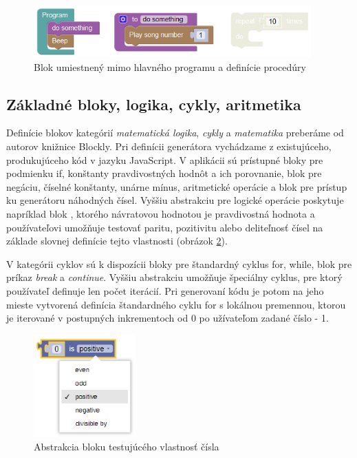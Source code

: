 \begin{figure}
\centerline{\includegraphics[width=0.95\textwidth]{images/disabled-orphan-block}}
\caption[Blok umiestnený mimo hlavného programu a definície procedúry]{Blok umiestnený mimo hlavného programu a definície procedúry}
\label{obr:disabled-orphan-block}
\end{figure}

\subsection{Základné bloky, logika, cykly, aritmetika}
Definície blokov kategórií \textit{matematická logika}, \textit{cykly} a \textit{matematika} preberáme od autorov knižnice Blockly. Pri definícii generátora vychádzame z existujúceho, produkujúceho kód v jazyku JavaScript. V aplikácii sú prístupné bloky pre podmienku if, konštanty pravdivostných hodnôt a ich porovnanie, blok pre negáciu, číselné konštanty, unárne mínus, aritmetické operácie a blok pre prístup ku generátoru náhodných čísel. Vyššiu abstrakciu pre logické operácie poskytuje napríklad blok , ktorého návratovou hodnotou je pravdivostná hodnota a používateľovi umožňuje testovať paritu, pozitivitu alebo deliteľnosť čísel na základe slovnej definície tejto vlastnosti (obrázok \ref{obr:block-number-property}).

V kategórii cyklov sú k dispozícii bloky pre štandardný cyklus for, while, blok pre príkaz \textit{break} a \textit{continue}. Vyššiu abstrakciu umožňuje špeciálny cyklus, pre ktorý používateľ definuje len počet iterácií. Pri generovaní kódu je potom na jeho mieste vytvorená definícia štandardného cyklu for s lokálnou premennou, ktorou je iterované v postupných inkrementoch od 0 po užívateľom zadané číslo - 1.

\begin{figure}
\centerline{\includegraphics[width=0.35\textwidth]{images/block-number-property}}
\caption[Abstrakcia bloku testujúcého vlastnosť čísla]{Abstrakcia bloku testujúcého vlastnosť čísla}
\label{obr:block-number-property}
\end{figure}

